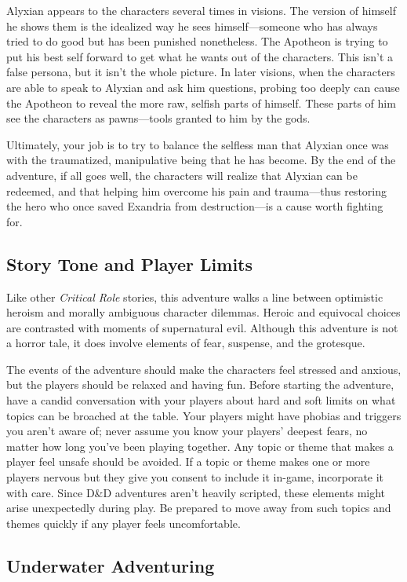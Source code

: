 \documentclass[a4paper, 11pt, bg=full, twocolumn, nooutline]{dndbook}
\begin{document}
Alyxian appears to the characters several times in visions. The version of himself he shows them is the idealized way he sees himself---someone who has always tried to do good but has been punished nonetheless. The Apotheon is trying to put his best self forward to get what he wants out of the characters. This isn't a false persona, but it isn't the whole picture. In later visions, when the characters are able to speak to Alyxian and ask him questions, probing too deeply can cause the Apotheon to reveal the more raw, selfish parts of himself. These parts of him see the characters as pawns---tools granted to him by the gods.

Ultimately, your job is to try to balance the selfless man that Alyxian once was with the traumatized, manipulative being that he has become. By the end of the adventure, if all goes well, the characters will realize that Alyxian can be redeemed, and that helping him overcome his pain and trauma---thus restoring the hero who once saved Exandria from destruction---is a cause worth fighting for.
\subsection{Story Tone and Player Limits}

Like other \textit{Critical Role} stories, this adventure walks a line between optimistic heroism and morally ambiguous character dilemmas. Heroic and equivocal choices are contrasted with moments of supernatural evil. Although this adventure is not a horror tale, it does involve elements of fear, suspense, and the grotesque.

The events of the adventure should make the characters feel stressed and anxious, but the players should be relaxed and having fun. Before starting the adventure, have a candid conversation with your players about hard and soft limits on what topics can be broached at the table. Your players might have phobias and triggers you aren't aware of; never assume you know your players' deepest fears, no matter how long you've been playing together. Any topic or theme that makes a player feel unsafe should be avoided. If a topic or theme makes one or more players nervous but they give you consent to include it in-game, incorporate it with care. Since D\&D adventures aren't heavily scripted, these elements might arise unexpectedly during play. Be prepared to move away from such topics and themes quickly if any player feels uncomfortable.
\subsection{Underwater Adventuring}
\end{document}
